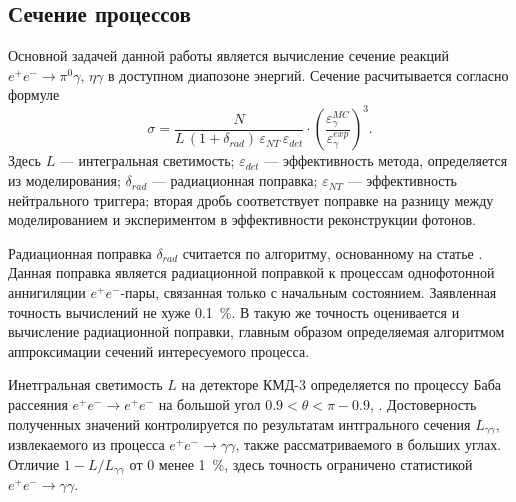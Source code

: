 \subsection{Сечение процессов}

Основной задачей данной работы является вычисление сечение реакций
$e^+e^- \to \pi^0 \gamma, \, \eta \gamma$ в доступном диапозоне энергий.
Сечение расчитывается согласно формуле
\begin{equation}
	\sigma = \frac{ N } { L \, (1+\delta_{rad}) \, \varepsilon_{NT} \,
	\varepsilon_{det}} \cdot  
	\left( \frac{ {\varepsilon^{MC}_{\gamma}} }{ {\varepsilon^{exp}_{\gamma}} } \right)^3.
\end{equation}
Здесь $L$ --- интегральная светимость;
$\varepsilon_{det}$ --- эффективность метода, определяется из моделирования;
$\delta_{rad}$ --- радиационная поправка;
$\varepsilon_{NT}$ --- эффективность нейтрального триггера;
вторая дробь соответствует поправке на разницу между моделированием и экспериментом в эффективности
реконструкции фотонов.

Радиационная поправка $\delta_{rad}$ считается по алгоритму, основанному на статье \cite{Kuraev1985}.
Данная поправка является радиационной поправкой к процессам однофотонной аннигиляции $e^+ e^-$-пары,
связанная только с начальным состоянием.
Заявленная точность вычислений не хуже \SI{0.1}{\percent}.
В такую же точность оценивается и вычисление радиационной поправки,
главным образом определяемая алгоритмом аппроксимации сечений интересуемого процесса.

Инетгральная светимость $L$ на детекторе КМД-3 определяется по процессу Баба рассеяния
$e^+e^- \to e^+e^-$ на большой угол $0.9 < \theta < \pi - 0.9$,
\cite{Ryzhenenkov:2017xqu}.
Достоверность полученных значений контролируется по результатам интгрального сечения $L_{\gamma \gamma}$,
извлекаемого из процесса $e^+e^- \to \gamma \gamma$,
также рассматриваемого в больших углах.
Отличие $1 - L / L_{\gamma \gamma}$ от 0 менее \SI{1}{\percent},
здесь точность ограничено статистикой $e^+e^- \to \gamma \gamma$.



